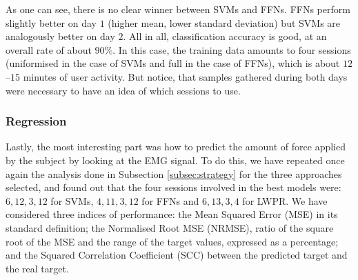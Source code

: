 As one can see, there is no clear winner between SVMs and FFNs. FFNs
perform slightly better on day $1$ (higher mean, lower standard
deviation) but SVMs are analogously better on day $2$. All in all,
classification accuracy is good, at an overall rate of about
$90\%$. In this case, the training data amounts to four sessions
(uniformised in the case of SVMs and full in the case of FFNs), which
is about $12$--$15$ minutes of user activity. But notice, that samples
gathered during both days were necessary to have an idea of which
sessions to use.

\subsubsection{Regression}

Lastly, the most interesting part was how to predict the amount of
force applied by the subject by looking at the EMG signal. To do this,
we have repeated once again the analysis done in Subsection
\ref{subsec:strategy} for the three approaches selected, and found out
that the four sessions involved in the best models were: $6,12,3,12$
for SVMs, $4,11,3,12$ for FFNs and $6,13,3,4$ for LWPR. We have
considered three indices of performance: the Mean Squared Error (MSE)
in its standard definition; the Normalised Root MSE (NRMSE), ratio of
the square root of the MSE and the range of the target values,
expressed as a percentage; and the Squared Correlation Coefficient
(SCC) between the predicted target and the real target.

